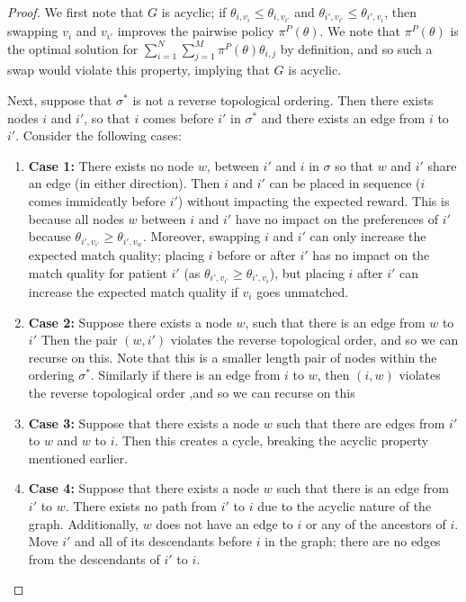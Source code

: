 \begin{proof}
We first note that $G$ is acyclic; if $\theta_{i,v_{i}} \leq \theta_{i,v_{i'}}$ and $\theta_{i',v_{i'}} \leq \theta_{i',v_{i}}$, then swapping $v_{i}$ and $v_{i'}$ improves the pairwise policy $\pi^{P}(\theta)$. 
We note that $\pi^{P}(\theta)$ is the optimal solution for $\sum_{i=1}^{N} \sum_{j=1}^{M} \pi^{P}(\theta) \theta_{i,j}$ by definition, and so such a swap would violate this property, implying that $G$ is acyclic. 

Next, suppose that $\sigma^{*}$ is not a reverse topological ordering. 
Then there exists nodes $i$ and $i'$, so that $i$ comes before $i'$ in $\sigma^{*}$ and there exists an edge from $i$ to $i'$. 
Consider the following cases: 
\begin{enumerate}
    \item \textbf{Case 1:} There exists no node $w$, between $i'$ and $i$ in $\sigma$ so that $w$ and $i'$ share an edge (in either direction). 
    Then $i$ and $i'$ can be placed in sequence ($i$ comes immideatly before $i'$) without impacting the expected reward. 
    This is because all nodes $w$ between $i$ and $i'$ have no impact on the preferences of $i'$ because $\theta_{i',v_{i'}} \geq \theta_{i',v_{w}}$. 
    Moreover, swapping $i$ and $i'$ can only increase the expected match quality; placing $i$ before or after $i'$ has no impact on the match quality for patient $i'$ (as $\theta_{i',v_{i'}} \geq \theta_{i',v_{i}}$), but placing $i$ after $i'$ can increase the expected match quality if $v_{i}$ goes unmatched. 
    \item \textbf{Case 2:} Suppose there exists a node $w$, such that there is an edge from $w$ to $i'$ Then the pair $(w,i')$ violates the reverse topological order, and so we can recurse on this. Note that this is a smaller length pair of nodes within the ordering $\sigma^{*}$. Similarly if there is an edge from $i$ to $w$, then $(i,w)$ violates the reverse topological order ,and so we can recurse on this
    \item \textbf{Case 3:} Suppose that there exists a node $w$ such that there are edges from $i'$ to $w$ and $w$ to $i$. Then this creates a cycle, breaking the acyclic property mentioned earlier. 
    \item \textbf{Case 4:} Suppose that there exists a node $w$ such that there is an edge from $i'$ to $w$. There exists no path from $i'$ to $i$ due to the acyclic nature of the graph. 
    Additionally, $w$ does not have an edge to $i$ or any of the ancestors of $i$. 
    Move $i'$ and all of its descendants before $i$ in the graph; there are no edges from the descendants of $i'$ to $i$. 

\end{enumerate}
\end{proof}
